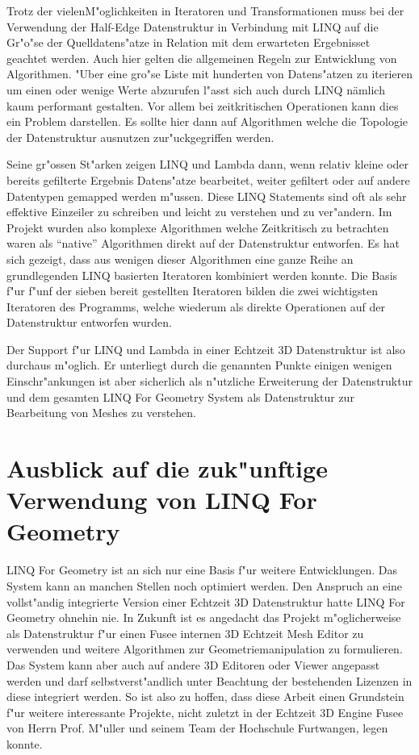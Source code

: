 \documentclass[pagesize, paper=a4, fontsize=12pt,titlepage=true, headings=small, headnosepline, abstractoff, liststotoc, nochapterprefix, plainheadsepline]{scrreprt}
\newcommand{\LFG}{LINQ For Geometry}
\newcommand{\LFGS}{LINQ For Geometry }
\newcommand{\HES}{Half-Edge Datenstruktur }
\begin{document}
Trotz der vielenM"oglichkeiten in Iteratoren und Transformationen muss bei der Verwendung der \HES in Verbindung mit LINQ auf die Gr"o"se der Quelldatens"atze in Relation mit dem erwarteten Ergebnisset geachtet werden. Auch hier gelten die allgemeinen Regeln zur Entwicklung von Algorithmen. "Uber eine gro"se Liste mit hunderten von Datens"atzen zu iterieren um einen oder wenige Werte abzurufen l"asst sich auch durch LINQ nämlich kaum performant gestalten. Vor allem bei zeitkritischen Operationen kann dies ein Problem darstellen. Es sollte hier dann auf Algorithmen welche die Topologie der Datenstruktur ausnutzen zur"uckgegriffen werden.

Seine gr"ossen St"arken zeigen LINQ und Lambda dann, wenn relativ kleine oder bereits gefilterte Ergebnis Datens"atze bearbeitet, weiter gefiltert oder auf andere Datentypen gemapped werden m"ussen. Diese LINQ Statements sind oft als sehr effektive Einzeiler zu schreiben und leicht zu verstehen und zu ver"andern. Im Projekt wurden also komplexe Algorithmen welche Zeitkritisch zu betrachten waren als "`native"' Algorithmen direkt auf der Datenstruktur entworfen. Es hat sich gezeigt, dass aus wenigen dieser Algorithmen eine ganze Reihe an grundlegenden LINQ basierten Iteratoren kombiniert werden konnte. Die Basis f"ur f"unf der sieben bereit gestellten Iteratoren bilden die zwei wichtigsten Iteratoren des Programms, welche wiederum als direkte Operationen auf der Datenstruktur entworfen wurden.


Der Support f"ur LINQ und Lambda in einer Echtzeit 3D Datenstruktur ist also durchaus m"oglich. Er unterliegt durch die genannten Punkte einigen wenigen Einschr"ankungen ist aber sicherlich als n"utzliche Erweiterung der Datenstruktur und dem gesamten \LFGS System als Datenstruktur zur Bearbeitung von Meshes zu verstehen.
\section{Ausblick auf die zuk"unftige Verwendung von \LFG}
\LFGS ist an sich nur eine Basis f"ur weitere Entwicklungen. Das System kann an manchen Stellen noch optimiert werden. Den Anspruch an eine vollst"andig integrierte Version einer Echtzeit 3D Datenstruktur hatte \LFGS ohnehin nie. In Zukunft ist es angedacht das Projekt m"oglicherweise als Datenstruktur f"ur einen Fusee internen 3D Echtzeit Mesh Editor zu verwenden und weitere Algorithmen zur Geometriemanipulation zu formulieren. Das System kann aber auch auf andere 3D Editoren oder Viewer angepasst werden und darf selbstverst"andlich unter Beachtung der bestehenden Lizenzen in diese integriert werden. So ist also zu hoffen, dass diese Arbeit einen Grundstein f"ur weitere interessante Projekte, nicht zuletzt in der Echtzeit 3D Engine Fusee von Herrn Prof. M"uller und seinem Team der Hochschule Furtwangen, legen konnte.
\end{document}
